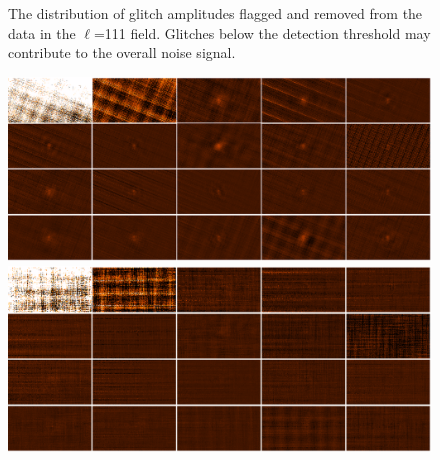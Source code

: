 \documentclass[12pt,preprint]{aastex}
\newcommand{\lon}{\ensuremath{\ell}}
\def\Figure#1#2#3#4{
\begin{figure}[htb]
\epsscale{#4}
\plotone{#1}
\caption{#2}
\label{#3}
\end{figure}
}
\def\FigureTwo#1#2#3#4#5{
\begin{figure}[htb]
\epsscale{#5}
\plottwo{#1}{#2}
\caption{#3}
\label{#4}
\end{figure}
}
\begin{document}
%
\Figure{crs}{The distribution of glitch amplitudes flagged and removed from the
data in the \lon=111 field.  Glitches below the detection threshold may
contribute to the overall noise signal.}{fig:GlitchDistribution}{1.0}

\begin{figure}
  \begin{minipage}{6.5in}
    \begin{center}
      \includegraphics[angle=270,scale=0.6]{eachpca}
    \end{center}
  \end{minipage}
\vspace{0.25in}
  \begin{minipage}{6.5in}
    \begin{center}
      \includegraphics[angle=270,scale=0.6]{eachpca_20iters}
    \end{center}
  \end{minipage}

\end{figure}
\end{document}
